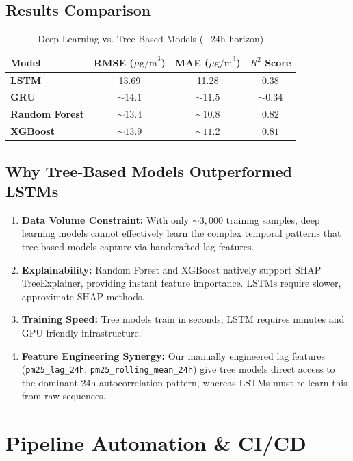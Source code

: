 \documentclass[11pt,a4paper]{article}
\begin{document}
\subsection{Results Comparison}

\begin{table}[h!]
\centering
\small
\begin{tabular}{lccc}
\toprule
\textbf{Model} & \textbf{RMSE ($\mu\text{g/m}^3$)} & \textbf{MAE ($\mu\text{g/m}^3$)} & \textbf{$R^2$ Score} \\
\midrule
\textbf{LSTM} & 13.69 & 11.28 & 0.38 \\
\textbf{GRU} & $\sim 14.1$ & $\sim 11.5$ & $\sim 0.34$ \\
\textbf{Random Forest} & $\sim 13.4$ & $\sim 10.8$ & $0.82$ \\
\textbf{XGBoost} & $\sim 13.9$ & $\sim 11.2$ & $0.81$ \\
\bottomrule
\end{tabular}
\caption{Deep Learning vs. Tree-Based Models (+24h horizon)}
\label{tab:dl_comparison}
\end{table}

\subsection{Why Tree-Based Models Outperformed LSTMs}
\begin{enumerate}
    \item \textbf{Data Volume Constraint:} With only $\sim 3,000$ training samples, deep learning models cannot effectively learn the complex temporal patterns that tree-based models capture via handcrafted lag features.
    \item \textbf{Explainability:} Random Forest and XGBoost natively support SHAP TreeExplainer, providing instant feature importance. LSTMs require slower, approximate SHAP methods.
    \item \textbf{Training Speed:} Tree models train in seconds; LSTM requires minutes and GPU-friendly infrastructure.
    \item \textbf{Feature Engineering Synergy:} Our manually engineered lag features (\texttt{pm25\_lag\_24h}, \texttt{pm25\_rolling\_mean\_24h}) give tree models direct access to the dominant 24h autocorrelation pattern, whereas LSTMs must re-learn this from raw sequences.
\end{enumerate}

\newpage
\section{Pipeline Automation \& CI/CD}
\end{document}
